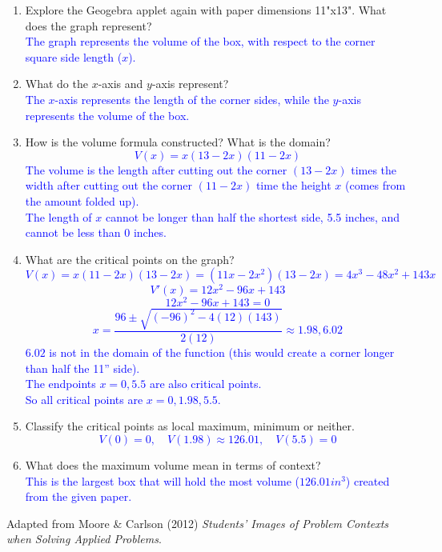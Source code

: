 \documentclass{ximera}
\begin{document}
\begin{exercise}
\begin{enumerate}
        \item Explore the Geogebra applet again with paper dimensions 11"x13".  What does the graph represent?\\
        \textcolor{blue}{The graph represents the volume of the box, with respect to the corner square side length ($x$).}
        \item What do the $x$-axis and $y$-axis represent? \\
        \textcolor{blue}{The $x$-axis represents the length of the corner sides, while the $y$-axis represents the volume of the box.}
        \item How is the volume formula constructed?  What is the domain?\\
        \textcolor{blue}{\[V(x)=x(13-2x)(11-2x)\]
        The volume is the length after cutting out the corner $(13-2x)$ times the width after cutting out the corner $(11-2x)$ time the height $x$ (comes from the amount folded up).\\
        The length of $x$ cannot be longer than half the shortest side, 5.5 inches, and cannot be less than 0 inches.}
        \item What are the critical points on the graph?\\
        \textcolor{blue}{
            \[V(x)=x(11-2x)(13-2x)=(11x-2x^2)(13-2x)=4x^3-48x^2+143x\]
            \[V'(x)=12x^2-96x+143\]
            \[12x^2-96x+143=0\]
            \[x=\frac{96\pm\sqrt{(-96)^2-4(12)(143)}}{2(12)}\approx 1.98,6.02\]
            $6.02$ is not in the domain of the function (this would create a corner longer than half the 11'' side). \\
            The endpoints $x=0,5.5$ are also critical points.\\
            So all critical points are $x=0,1.98,5.5$.
        }
        \item Classify the critical points as local maximum, minimum or neither.\\
        \textcolor{blue}{
  \[
    V(0)=0,\quad
    V(1.98)\approx 126.01,\quad
    V(5.5)=0
  \]
}
        \item What does the maximum volume mean in terms of context?\\
        \textcolor{blue}{This is the largest box that will hold the most volume ($126.01in^3$) created from the given paper.}
    \end{enumerate}
    Adapted from Moore \& Carlson (2012) \textit{Students' Images of Problem Contexts when Solving Applied Problems}.
\end{exercise}
\end{document}
